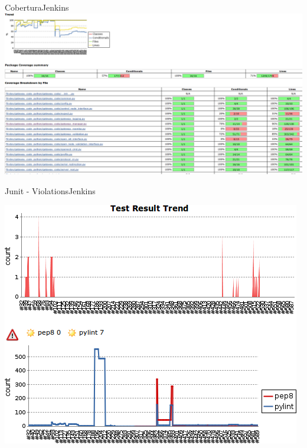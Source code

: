 \documentclass[9pt]{beamer}
\begin{document}
\begin{frame}{Cobertura}{Jenkins}
  \includegraphics[width=\linewidth]{images/cobertura}\\
\end{frame}
\begin{frame}{Junit - Violations}{Jenkins}
  \begin{center}
    \includegraphics[height=0.8\textheight]{images/junit_violations}\\
  \end{center}
\end{frame}
\end{document}
